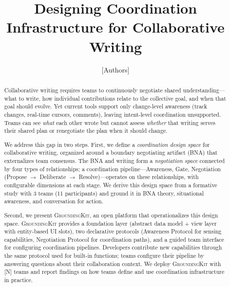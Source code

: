 \documentclass[sigconf,screen]{acmart}
\newcommand{\system}{\textsc{GroundingKit}}
\begin{document}
\title{Designing Coordination Infrastructure for Collaborative Writing}

\author{[Authors]}
\affiliation{\institution{[Institution]}}
\email{[email]}

\begin{abstract}
Collaborative writing requires teams to continuously negotiate shared understanding---what to write, how individual contributions relate to the collective goal, and when that goal should evolve. Yet current tools support only change-level awareness (track changes, real-time cursors, comments), leaving intent-level coordination unsupported. Teams can see \emph{what} each other wrote but cannot assess \emph{whether} that writing serves their shared plan or renegotiate the plan when it should change.

We address this gap in two steps. First, we define a \emph{coordination design space} for collaborative writing, organized around a boundary negotiating artifact (BNA) that externalizes team consensus. The BNA and writing form a \emph{negotiation space} connected by four types of relationships; a coordination pipeline---Awareness, Gate, Negotiation (Propose $\rightarrow$ Deliberate $\rightarrow$ Resolve)---operates on these relationships, with configurable dimensions at each stage. We derive this design space from a formative study with 3 teams (11 participants) and ground it in BNA theory, situational awareness, and conversation for action.

Second, we present \system{}, an open platform that operationalizes this design space. \system{} provides a foundation layer (abstract data model + view layer with entity-based UI slots), two declarative protocols (Awareness Protocol for sensing capabilities, Negotiation Protocol for coordination paths), and a guided team interface for configuring coordination pipelines. Developers contribute new capabilities through the same protocol used for built-in functions; teams configure their pipeline by answering questions about their collaboration context. We deploy \system{} with [N] teams and report findings on how teams define and use coordination infrastructure in practice.
\end{abstract}

\maketitle









\end{document}
